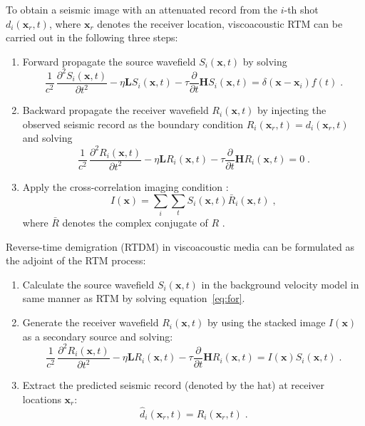 To obtain a seismic image with an attenuated record from the $i$-th shot $d_i(\mathbf{x}_r,t)$, where $\mathbf{x}_r$ denotes the receiver location, viscoacoustic RTM can be carried out in the following three steps:
\begin{enumerate}
  \item Forward propagate the source wavefield $S_i(\mathbf{x},t)$ by solving
  \begin{equation}
      {\frac{1}{c^2}}\,{\frac{\partial^2 S_i(\mathbf{x},t)}{\partial t^2}} - \eta \mathbf{L} S_i(\mathbf{x},t) - \tau \frac{\partial}{\partial t}\mathbf{H} S_i(\mathbf{x},t) = \delta(\mathbf{x}-\mathbf{x}_i) f(t) \; .
  \label{eq:for}
  \end{equation}
  \item Backward propagate the receiver wavefield $R_i(\mathbf{x},t)$ by injecting the observed seismic record as the boundary condition $R_i(\mathbf{x}_r,t) = d_i(\mathbf{x}_r,t)$ and solving
  \begin{equation}
      {\frac{1}{c^2}}\,{\frac{\partial^2 R_i(\mathbf{x},t)}{\partial t^2}} - \eta \mathbf{L} R_i(\mathbf{x},t) - \tau \frac{\partial}{\partial t} \mathbf{H} R_i(\mathbf{x},t) = 0 \;.
  \label{eq:back} 
  \end{equation}
  \item Apply the cross-correlation imaging condition \cite[]{iei}:
  \begin{equation}
    \label{eq:ccr}
    I(\mathbf{x}) = \sum\limits_i \sum\limits_t S_i(\mathbf{x},t) \bar{R}_i(\mathbf{x},t) \;,
  \end{equation}
  where $\bar{R}$ denotes the complex conjugate of $R$ \cite[]{me13}.
\end{enumerate}

Reverse-time demigration (RTDM) in viscoacoustic media can be formulated as the adjoint of the RTM process:
\begin{enumerate}
  \item Calculate the source wavefield $S_i(\mathbf{x},t)$ in the background velocity model in  same manner as RTM by solving equation~\ref{eq:for}.
  \item Generate the receiver wavefield $R_i(\mathbf{x},t)$ by using the stacked image $I(\mathbf{x})$ as a secondary source and solving:
  \begin{equation}
      {\frac{1}{c^2}}\,{\frac{\partial^2 R_i(\mathbf{x},t)}{\partial t^2}} - \eta \mathbf{L} R_i(\mathbf{x},t) - \tau \frac{\partial}{\partial t} \mathbf{H} R_i(\mathbf{x},t) = I(\mathbf{x})S_i(\mathbf{x},t) \; .
  \label{eq:back2}
  \end{equation}
  \item Extract the predicted seismic record (denoted by the hat) at receiver locations $\mathbf{x}_r$:
  \begin{equation}
    \widehat{d}_i(\mathbf{x}_r,t) = R_i(\mathbf{x}_r,t) \;.
  \end{equation}
\end{enumerate}

